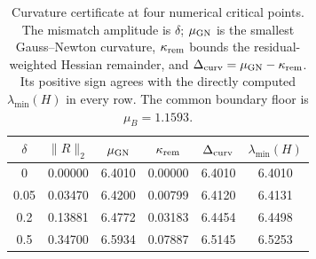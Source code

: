 \begin{table}[t]
\centering
\small
\setlength{\tabcolsep}{4pt}
\renewcommand{\arraystretch}{1.12}
\begin{tabular}{@{}cccccc@{}}
\hline
$\delta$ & $\|R\|_2$ & $\mu_{\rm GN}$ & $\kappa_{\rm rem}$ & $\Delta_{\rm curv}$ & $\lambda_{\min}(H)$ \\
\hline
0 & 0.00000 & 6.4010 & 0.00000 & 6.4010 & 6.4010 \\
0.05 & 0.03470 & 6.4200 & 0.00799 & 6.4120 & 6.4131 \\
0.2 & 0.13881 & 6.4772 & 0.03183 & 6.4454 & 6.4498 \\
0.5 & 0.34700 & 6.5934 & 0.07887 & 6.5145 & 6.5253 \\
\hline
\end{tabular}
\caption{Curvature certificate at four numerical critical points.  The mismatch amplitude is $\delta$; $\mu_{\rm GN}$ is the smallest Gauss--Newton curvature, $\kappa_{\rm rem}$ bounds the residual-weighted Hessian remainder, and $\Delta_{\rm curv}=\mu_{\rm GN}-\kappa_{\rm rem}$.  Its positive sign agrees with the directly computed $\lambda_{\min}(H)$ in every row.  The common boundary floor is $\mu_B=1.1593$.}
\label{tab:critical-point-certificate}
\end{table}
